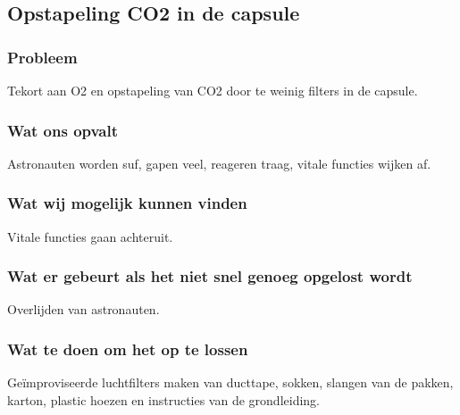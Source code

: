 \subsection{Opstapeling CO2 in de capsule}

\subsubsection{Probleem}
Tekort aan O2 en opstapeling van CO2 door te weinig filters in de capsule.

\subsubsection{Wat ons opvalt}
Astronauten worden suf, gapen veel, reageren traag, vitale functies wijken af.

\subsubsection{Wat wij mogelijk kunnen vinden}
Vitale functies gaan achteruit.

\subsubsection{Wat er gebeurt als het niet snel genoeg opgelost wordt}
Overlijden van astronauten.

\subsubsection{Wat te doen om het op te lossen}
Geïmproviseerde luchtfilters maken van ducttape, sokken, slangen van de pakken, karton, plastic hoezen en instructies van de grondleiding.